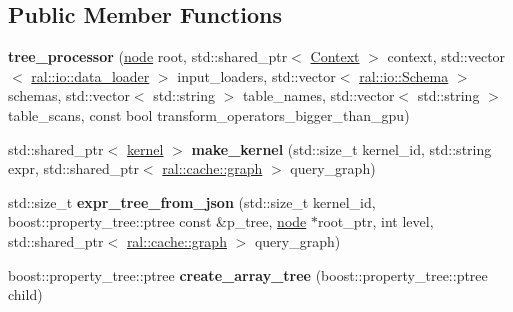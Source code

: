 \subsection*{Public Member Functions}
\begin{DoxyCompactItemize}
\item 
\mbox{\label{structral_1_1batch_1_1tree__processor_adc5da4556f8c70a08476a61b9042f9d9}} 
{\bfseries tree\+\_\+processor} (\hyperlink{structral_1_1batch_1_1node}{node} root, std\+::shared\+\_\+ptr$<$ \hyperlink{classblazingdb_1_1manager_1_1Context}{Context} $>$ context, std\+::vector$<$ \hyperlink{classral_1_1io_1_1data__loader}{ral\+::io\+::data\+\_\+loader} $>$ input\+\_\+loaders, std\+::vector$<$ \hyperlink{classral_1_1io_1_1Schema}{ral\+::io\+::\+Schema} $>$ schemas, std\+::vector$<$ std\+::string $>$ table\+\_\+names, std\+::vector$<$ std\+::string $>$ table\+\_\+scans, const bool transform\+\_\+operators\+\_\+bigger\+\_\+than\+\_\+gpu)
\item 
\mbox{\label{structral_1_1batch_1_1tree__processor_a380b0ebf92171d2bc12a40bcc465c0fc}} 
std\+::shared\+\_\+ptr$<$ \hyperlink{classral_1_1cache_1_1kernel}{kernel} $>$ {\bfseries make\+\_\+kernel} (std\+::size\+\_\+t kernel\+\_\+id, std\+::string expr, std\+::shared\+\_\+ptr$<$ \hyperlink{classral_1_1cache_1_1graph}{ral\+::cache\+::graph} $>$ query\+\_\+graph)
\item 
\mbox{\label{structral_1_1batch_1_1tree__processor_aad6415f756e52d44f91fb2d21f8e3f78}} 
std\+::size\+\_\+t {\bfseries expr\+\_\+tree\+\_\+from\+\_\+json} (std\+::size\+\_\+t kernel\+\_\+id, boost\+::property\+\_\+tree\+::ptree const \&p\+\_\+tree, \hyperlink{structral_1_1batch_1_1node}{node} $\ast$root\+\_\+ptr, int level, std\+::shared\+\_\+ptr$<$ \hyperlink{classral_1_1cache_1_1graph}{ral\+::cache\+::graph} $>$ query\+\_\+graph)
\item 
\mbox{\label{structral_1_1batch_1_1tree__processor_a1ef5919766ba268b525d228218b6865f}} 
boost\+::property\+\_\+tree\+::ptree {\bfseries create\+\_\+array\+\_\+tree} (boost\+::property\+\_\+tree\+::ptree child)
\item 
\mbox{\label{structral_1_1batch_1_1tree__processor_a99c4e9e369c38f1a0a10c1b51a2d0353}} 

\end{DoxyCompactItemize}
